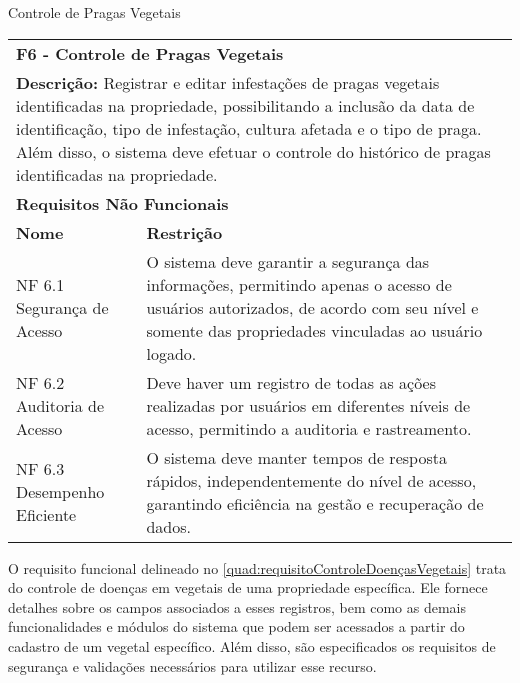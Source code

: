 \begin{tabframed}[htb]
  \caption{Controle de Pragas Vegetais}
  \label{quad:requisitoControlePragasVegetais}
  \renewcommand{\arraystretch}{1.5}
  \begin{tabular}{|l|l|}
    \cline{1-2}
    \multicolumn{2}{|l|}{\textbf{F6 - Controle de Pragas Vegetais}}
    \\ \cline{1-2}

    \multicolumn{2}{|p{15cm}|}{
    \raggedright \textbf{Descrição:} Registrar e editar infestações de pragas vegetais identificadas na propriedade, possibilitando a inclusão da data de identificação, tipo de infestação, cultura afetada e o tipo de praga. Além disso, o sistema deve efetuar o controle do histórico de pragas identificadas na propriedade.
    }
    \\ \cline{1-2}

    \multicolumn{2}{|l|}{\textbf{Requisitos Não Funcionais}}
    \\ \cline{1-2}

    \textbf{Nome}               &
    \textbf{Restrição}
    \\ \cline{1-2}

    NF 6.1 Segurança de Acesso  &
    \multicolumn{1}{|p{8cm}|}{\raggedright O sistema deve garantir a segurança das informações, permitindo apenas o acesso de usuários autorizados, de acordo com seu nível e somente das propriedades vinculadas ao usuário logado.}
    \\ \cline{1-2}

    NF 6.2 Auditoria de Acesso  &
    \multicolumn{1}{|p{8cm}|}{\raggedright Deve haver um registro de todas as ações realizadas por usuários em diferentes níveis de acesso, permitindo a auditoria e rastreamento.}
    \\ \cline{1-2}

    NF 6.3 Desempenho Eficiente &
    \multicolumn{1}{|p{8cm}|}{\raggedright O sistema deve manter tempos de resposta rápidos, independentemente do nível de acesso, garantindo eficiência na gestão e recuperação de dados.}
    \\ \cline{1-2}
  \end{tabular}
  \fonte{} %
\end{tabframed}

\clearpage

O requisito funcional delineado no \autoref{quad:requisitoControleDoençasVegetais} trata do controle de doenças em vegetais de uma propriedade específica. Ele fornece detalhes sobre os campos associados a esses registros, bem como as demais funcionalidades e módulos do sistema que podem ser acessados a partir do cadastro de um vegetal específico. Além disso, são especificados os requisitos de segurança e validações necessários para utilizar esse recurso.

